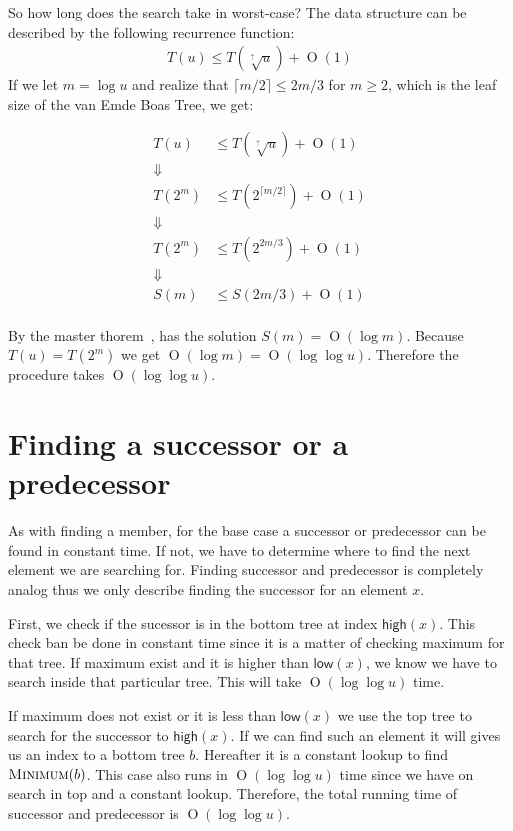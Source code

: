 \documentclass[oneside,11pt,openright]{report}
\newcommand{\BigO}[1]{\ensuremath{\operatorname{O}\left(#1\right)}}
\newcommand{\Minimum}{\textsc{Minimum}}
\newcommand{\HIGH}{\textsf{high}}
\newcommand{\LOW}{\textsf{low}}
\newcommand{\HIGHER}{\sqrt[\uparrow]{u}}
\begin{document}
So how long does the search take in worst-case? The data structure can be described by the following recurrence function: 
\begin{align*}
    T(u) \leq T(\HIGHER) + \BigO{1}
\end{align*}
If we let $m = \log u$ and realize that $\lceil{m/2}\rceil \leq 2m/3$ for $m \geq 2$, which is the leaf size of the van Emde Boas Tree, we get:

\begin{align*}
    T(u)  & \leq T(\HIGHER) + \BigO{1} \\
    \Downarrow \\
    T(2^m) & \leq T(2^{\lceil{m/2}\rceil}) + \BigO{1} \\
    \Downarrow \\
    T(2^m) & \leq T(2^{2m/3}) + \BigO{1} \\
    \Downarrow \\
    S(m) & \leq S(2m/3) + \BigO{1} \\
\end{align*}

By the master thorem~\cite[p. 93]{ITA09}, has the solution $S(m) = \BigO{\log m}$. Because $T(u) = T(2^m)$ we get $\BigO{\log m} = \BigO{\log \log u}$. Therefore the procedure takes $\BigO{\log \log u}$.

\section{Finding a successor or a predecessor}

As with finding a member, for the base case a successor or predecessor can be found in constant time. If not, we have to determine where to find the next element we are searching for. Finding successor and predecessor is completely analog thus we only describe finding the successor for an element $x$.

First, we check if the sucessor is in the bottom tree at index $\HIGH(x)$. This check ban be done in constant time since it is a matter of checking maximum for that tree. If maximum exist and it is higher than $\LOW(x)$, we know we have to search inside that particular tree. This will take $\BigO{\log\log u}$ time.

If maximum does not exist or it is less than $\LOW(x)$ we use the top tree to search for the successor to $\HIGH(x)$. If we can find such an element it will gives us an index to a bottom tree $b$. Hereafter it is a constant lookup to find $\Minimum(b)$. This case also runs in $\BigO{\log\log u}$ time since we have on search in top and a constant lookup. Therefore, the total running time of successor and predecessor is $\BigO{\log\log u}$.
\end{document}
